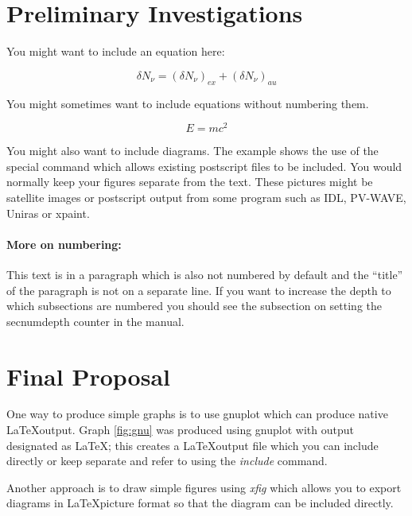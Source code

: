 \documentclass{article}
\begin{document}
\section{Preliminary Investigations}

You might want to include an equation here:

\begin{equation} \delta N_{\nu} = (\delta N_{\nu})_{ex} + (\delta N_{\nu})_{au} 
\label{equation:delsplit}
\end{equation}

You might sometimes want to include equations without numbering them.

\begin{displaymath}
E=mc^{2}
\end{displaymath}

You might also want to include diagrams.  The example shows the use of
the special command which allows existing postscript files to be
included.  You would normally keep your figures separate from the text. 
These pictures might be satellite images or postscript output from some
program such as IDL, PV-WAVE, Uniras or xpaint.

\paragraph{More on numbering:}

This text is in a paragraph which is also not numbered by default and
the ``title'' of the paragraph is not on a separate line.
If you want to increase the depth to which subsections are numbered you
should see the subsection on setting the secnumdepth counter in the manual. 


\section{Final Proposal}

One way to produce simple graphs is to use gnuplot which can produce
native \LaTeX  output. Graph \ref{fig:gnu} was produced using gnuplot with
output designated as \LaTeX; this creates a \LaTeX output file which you
can include directly or keep separate and refer to using the {\em
include} command.

Another approach is to draw simple figures using {\em xfig} which allows
you to export diagrams in \LaTeX picture format so that the diagram can
be included directly.
\end{document}
